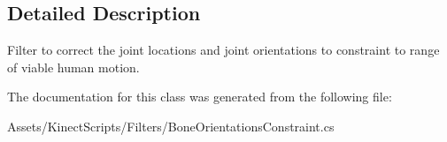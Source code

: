 \subsection{Detailed Description}
Filter to correct the joint locations and joint orientations to constraint to range of viable human motion. 



The documentation for this class was generated from the following file\+:\begin{DoxyCompactItemize}
\item 
Assets/\+Kinect\+Scripts/\+Filters/Bone\+Orientations\+Constraint.\+cs\end{DoxyCompactItemize}
